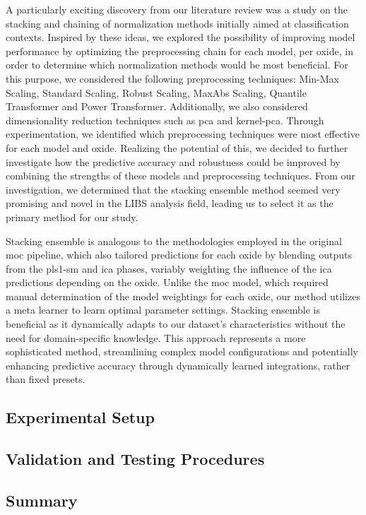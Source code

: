 A particularly exciting discovery from our literature review was a study on the stacking and chaining of normalization methods initially aimed at classification contexts.
Inspired by these ideas, we explored the possibility of improving model performance by optimizing the preprocessing chain for each model, per oxide, in order to determine which normalization methods would be most beneficial.
For this purpose, we considered the following preprocessing techniques: Min-Max Scaling, Standard Scaling, Robust Scaling, MaxAbs Scaling, Quantile Transformer and Power Transformer.
Additionally, we also considered dimensionality reduction techniques such as \gls{pca} and \gls{kernel-pca}.
Through experimentation, we identified which preprocessing techniques were most effective for each model and oxide.
Realizing the potential of this, we decided to further investigate how the predictive accuracy and robustness could be improved by combining the strengths of these models and preprocessing techniques.
From our investigation, we determined that the stacking ensemble method seemed very promising and novel in the LIBS analysis field, leading us to select it as the primary method for our study.

Stacking ensemble is analogous to the methodologies employed in the original \gls{moc} pipeline, which also tailored predictions for each oxide by blending outputs from the \gls{pls1-sm} and \gls{ica} phases, variably weighting the influence of the \gls{ica} predictions depending on the oxide.
Unlike the \gls{moc} model, which required manual determination of the model weightings for each oxide, our method utilizes a meta learner to learn optimal parameter settings.
Stacking ensemble is beneficial as it dynamically adapts to our dataset's characteristics without the need for domain-specific knowledge.
This approach represents a more sophisticated method, streamlining complex model configurations and potentially enhancing predictive accuracy through dynamically learned integrations, rather than fixed presets.

\subsection{Experimental Setup}

\subsection{Validation and Testing Procedures}


\subsection{Summary}
